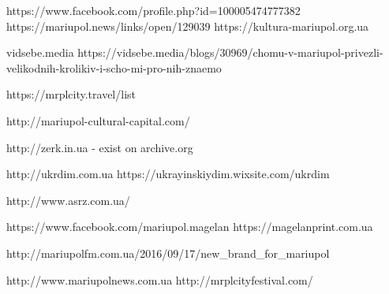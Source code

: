  
 
 
 
 

https://www.facebook.com/profile.php?id=100005474777382
https://mariupol.news/links/open/129039
https://kultura-mariupol.org.ua

vidsebe.media
https://vidsebe.media/blogs/30969/chomu-v-mariupol-privezli-velikodnih-krolikiv-i-scho-mi-pro-nih-znaemo

https://mrplcity.travel/list

http://mariupol-cultural-capital.com/

http://zerk.in.ua - exist on archive.org

http://ukrdim.com.ua
https://ukrayinskiydim.wixsite.com/ukrdim

http://www.asrz.com.ua/

https://www.facebook.com/mariupol.magelan
https://magelanprint.com.ua

http://mariupolfm.com.ua/2016/09/17/new_brand_for_mariupol

http://www.mariupolnews.com.ua
http://mrplcityfestival.com/
